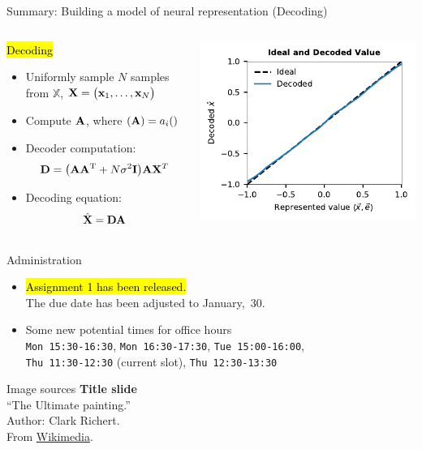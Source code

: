 \documentclass[handout,aspectratio=169]{beamer}
\begin{document}
\begin{frame}{Summary: Building a model of neural representation (Decoding)}
	\begin{columns}
		\begin{block}{\hl{Decoding}}
		\begin{itemize}
			\setlength{\itemsep}{0.25cm}
			\item Uniformly sample $N$ samples from $\mathbb{X}$, ${\mathbf{X}} = \big( {\mathbf{x}}_1, \ldots, {\mathbf{x}}_N \big)$
			\item Compute ${\mathbf{A}}$, where $({\mathbf{A}}) = a_i({\mathbf{)}}$
			\item Decoder computation:\vspace{-0.25cm}
			$${\mathbf{D}} = \big( {\mathbf{A}} {\mathbf{A}}^{\mathrm{T}} + N \sigma^2 {\mathbf{I}} \big) {\mathbf{A}} {\mathbf{X}}^T$$
			\item Decoding equation:\vspace{-0.25cm}
			$$\hat{{\mathbf{X}}} = {\mathbf{D}} {\mathbf{A}}$$
		\end{itemize}
		\end{block}
		\includegraphics{media/decoding.pdf}
	\end{columns}
\end{frame}

\backupbegin

\begin{frame}{Administration}
	\begin{itemize}
		\setlength{\itemsep}{0.75cm}
		\item \hl{Assignment 1 has been released.}\\[0.25cm]
		The due date has been adjusted to January,~30.
		\item Some new potential times for office hours\\[0.5cm]
			{\color{aluminium4}\texttt{Mon 15:30-16:30}, \texttt{Mon 16:30-17:30}, \texttt{Tue 15:00-16:00},}\\[0.5cm]
			\texttt{Thu 11:30-12:30} (current slot){\color{aluminium4}, \texttt{Thu 12:30-13:30}}
	\end{itemize}
\end{frame}

\begin{frame}[noframenumbering]{Image sources}
	\small
	\textbf{Title slide}\\\enquote{The Ultimate painting.}\\Author: Clark Richert.\\From \href{https://commons.wikimedia.org/wiki/File:\%22The_Ultimate_painting\%22.jpg}{Wikimedia}.
\end{frame}


\backupend
\end{document}
